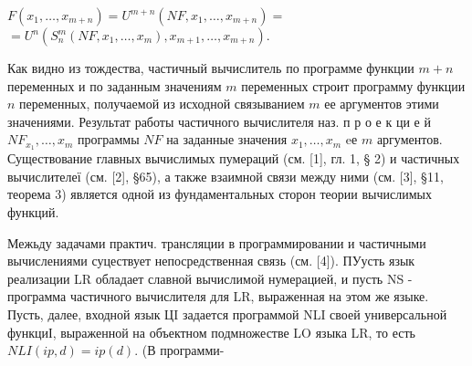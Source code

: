 \documentclass[10pt]{article}
\begin{document}
$F\left(x_{1}, \ldots, x_{m+n}\right)=U^{m+n}\left(N F, x_{1}, \ldots, x_{m+n}\right)=$ $=U^{n}\left(S_{n}^{m}\left(N F, x_{1}, \ldots, x_{m}\right), x_{m+1}, \ldots, x_{m+n}\right)$.



Как видно из тождества, частичный вычислитель по программе функции $m+n$ переменных и по заданным значениям $m$ переменных строит программу функции $n$ переменных, получаемой из исходной связыванием $m$ ее аргументов этими значениями. Результат работы частичного вычислителя наз. п р о е к ци е й $N F_{x_{1}}, \ldots, x_{m}$ программы $N F$ на заданные значения $x_{1}, \ldots, x_{m}$ eе $m$ аргументов. Существование главных вычислимых пумераций (см. [1], гл. 1, § 2) и частичных вычислителеї (см. [2], §65), а также взаимной связи между ними (см. [3], §11, теорема 3) является одной из фундаментальных сторон теории вычислимых функций.



Межьду задачами практич. трансляции в программировании и частичными вычислениями суцествует непосредственная связь (см. [4]). ПУусть язык реализации LR обладает славной вычислимой нумерацией, и пусть NS - программа частичного вычислителя для LR, выраженная на этом же языке. Пусть, далее, входной язык ЦI задается программой NLI своей универсальной функциІ, выраженной на объектном подмножестве LO языка LR, то есть $N L I(i p, d)=i p(d)$. (В программи-
\end{document}

